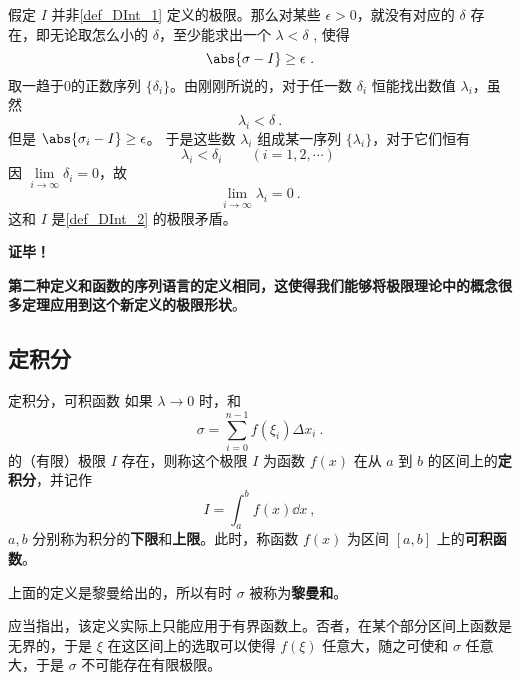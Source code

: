 假定 $I$ 并非\autoref{def_DInt_1} 定义的极限。那么对某些 $\epsilon>0$，就没有对应的 $\delta$ 存在，即无论取怎么小的 $\delta$，至少能求出一个 $\lambda<\delta$ , 使得
\begin{equation}
\abs{\sigma-I}\geq\epsilon~.
\end{equation}
取一趋于0的正数序列 $\{\delta_i\}$。由刚刚所说的，对于任一数 $\delta_i$ 恒能找出数值 $\lambda_i$，虽然
\begin{equation}
\lambda_i<\delta~.
\end{equation}
但是 $\abs{\sigma_i-I}\geq\epsilon$。
于是这些数 $\lambda_i$ 组成某一序列 $\{\lambda_i\}$，对于它们恒有
\begin{equation}
\lambda_i<\delta_i\qquad(i=1,2,\cdots)~
\end{equation}
因 $\lim\limits_{i\rightarrow\infty}\delta_i=0$，故
\begin{equation}
\lim\limits_{i\rightarrow\infty}\lambda_i=0~.
\end{equation}
这和 $I$ 是\autoref{def_DInt_2} 的极限矛盾。

\textbf{证毕！}

\textbf{第二种定义和函数的序列语言的定义相同，这使得我们能够将极限理论中的概念很多定理应用到这个新定义的极限形状}。
\subsection{定积分}
\begin{definition}{定积分，可积函数}\label{def_DInt_3}
如果 $\lambda\rightarrow0$ 时，和  
\begin{equation}
\sigma=\sum_{i=0}^{n-1}f(\xi_i)\Delta x_i~.
\end{equation}
的（有限）极限 $I$ 存在，则称这个极限 $I$ 为函数 $f(x)$ 在从 $a$ 到 $b$ 的区间上的\textbf{定积分}，并记作
\begin{equation}
I=\int_a^bf(x)\dd x~,
\end{equation}
$a,b$ 分别称为积分的\textbf{下限}和\textbf{上限}。此时，称函数 $f(x)$ 为区间 $[a,b]$ 上的\textbf{可积函数}。
\end{definition}

上面的定义是黎曼给出的，所以有时 $\sigma$ 被称为\textbf{黎曼和}。

应当指出，该定义实际上只能应用于有界函数上。否者，在某个部分区间上函数是无界的，于是 $\xi$ 在这区间上的选取可以使得 $f(\xi)$ 任意大，随之可使和 $\sigma$ 任意大，于是 $\sigma$ 不可能存在有限极限。
